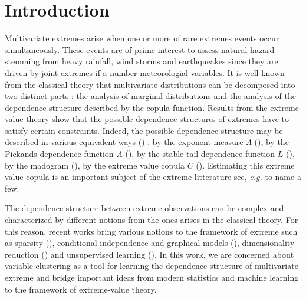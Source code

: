 \documentclass[11pt]{article}
\begin{document}
	\section{Introduction}
	Multivariate extremes arise when one or more of rare extremes events occur simultaneously. These events are of prime interest to assess natural hazard stemming from heavy rainfall, wind storms and earthqueakes since they are driven by joint extremes if a number meteorologial variables. It is well known from the classical theory that multivariate distributions can be decomposed into two distinct parts : the analysis of marginal distributions and the analysis of the dependence structure described by the copula function. Results from the extreme-value theory show that the possible dependence structures of extremes have to satisfy certain constraints. Indeed, the possible dependence structure may be described in various equivalent ways (\cite{resnick2008extreme, beirlant2004statistics, de2006extreme}) : by the exponent measure $\Lambda$ (\cite{balkema1977max}), by the Pickands dependence function $A$ (\cite{pickands1981multivariate}), by the stable tail dependence function $L$ (\cite{huang1992statistics}), by the madogram (\cite{naveau2009modelling}), by the extreme value copula $C$ (\cite{gudendorf2010}). Estimating this extreme value copula is an important subject of the extreme litterature see, \emph{e.g.} \cite{bucher2011new, gudendorf2012nonparametric, MARCON20171, escobar2018local} to name a few.
	
	The dependence structure between extreme observations can be complex and characterized by different notions from the ones arises in the classical theory. For this reason, recent works bring various notions to the framework of extreme such as sparsity (\cite{goix2015learning, simpson2020determining, meyer2021sparse}), conditional independence and graphical models (\cite{gissibl2018max, engelke2020graphical, segers2020one}), dimensionality reduction (\cite{chautru2015dimension, drees2021principal}) and unsupervised learning (\cite{cooley2019decompositions, janssen2020k}). In this work, we are concerned about variable clustering as a tool for learning the dependence structure of multivariate extreme and bridge important ideas from modern statistics and machine learning to the framework of extreme-value theory.
	
\end{document}
